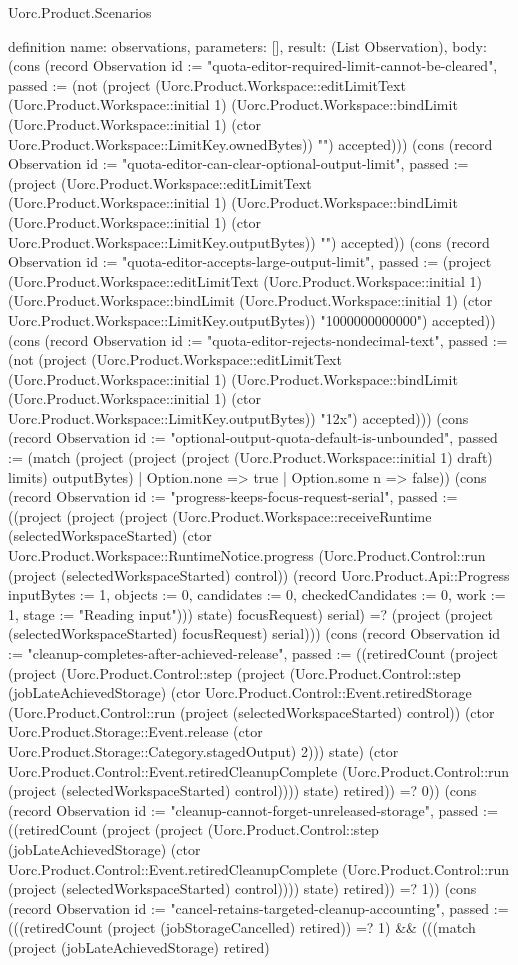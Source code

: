 \begin{lexlean}{Uorc.Product.Scenarios}
\begin{semanticmodule}
definition{
  name: observations,
  parameters: [],
  result: (List Observation),
  body: (cons (record Observation {id := "quota-editor-required-limit-cannot-be-cleared", passed := (not (project (Uorc.Product.Workspace::editLimitText (Uorc.Product.Workspace::initial 1) (Uorc.Product.Workspace::bindLimit (Uorc.Product.Workspace::initial 1) (ctor Uorc.Product.Workspace::LimitKey.ownedBytes)) "") accepted))}) (cons (record Observation {id := "quota-editor-can-clear-optional-output-limit", passed := (project (Uorc.Product.Workspace::editLimitText (Uorc.Product.Workspace::initial 1) (Uorc.Product.Workspace::bindLimit (Uorc.Product.Workspace::initial 1) (ctor Uorc.Product.Workspace::LimitKey.outputBytes)) "") accepted)}) (cons (record Observation {id := "quota-editor-accepts-large-output-limit", passed := (project (Uorc.Product.Workspace::editLimitText (Uorc.Product.Workspace::initial 1) (Uorc.Product.Workspace::bindLimit (Uorc.Product.Workspace::initial 1) (ctor Uorc.Product.Workspace::LimitKey.outputBytes)) "1000000000000") accepted)}) (cons (record Observation {id := "quota-editor-rejects-nondecimal-text", passed := (not (project (Uorc.Product.Workspace::editLimitText (Uorc.Product.Workspace::initial 1) (Uorc.Product.Workspace::bindLimit (Uorc.Product.Workspace::initial 1) (ctor Uorc.Product.Workspace::LimitKey.outputBytes)) "12x") accepted))}) (cons (record Observation {id := "optional-output-quota-default-is-unbounded", passed := (match (project (project (project (Uorc.Product.Workspace::initial 1) draft) limits) outputBytes)
    | Option.none => true
    | Option.some n => false)}) (cons (record Observation {id := "progress-keeps-focus-request-serial", passed := ((project (project (project (Uorc.Product.Workspace::receiveRuntime (selectedWorkspaceStarted) (ctor Uorc.Product.Workspace::RuntimeNotice.progress (Uorc.Product.Control::run (project (selectedWorkspaceStarted) control)) (record Uorc.Product.Api::Progress {inputBytes := 1, objects := 0, candidates := 0, checkedCandidates := 0, work := 1, stage := "Reading input"}))) state) focusRequest) serial) =? (project (project (selectedWorkspaceStarted) focusRequest) serial))}) (cons (record Observation {id := "cleanup-completes-after-achieved-release", passed := ((retiredCount (project (project (Uorc.Product.Control::step (project (Uorc.Product.Control::step (jobLateAchievedStorage) (ctor Uorc.Product.Control::Event.retiredStorage (Uorc.Product.Control::run (project (selectedWorkspaceStarted) control)) (ctor Uorc.Product.Storage::Event.release (ctor Uorc.Product.Storage::Category.stagedOutput) 2))) state) (ctor Uorc.Product.Control::Event.retiredCleanupComplete (Uorc.Product.Control::run (project (selectedWorkspaceStarted) control)))) state) retired)) =? 0)}) (cons (record Observation {id := "cleanup-cannot-forget-unreleased-storage", passed := ((retiredCount (project (project (Uorc.Product.Control::step (jobLateAchievedStorage) (ctor Uorc.Product.Control::Event.retiredCleanupComplete (Uorc.Product.Control::run (project (selectedWorkspaceStarted) control)))) state) retired)) =? 1)}) (cons (record Observation {id := "cancel-retains-targeted-cleanup-accounting", passed := (((retiredCount (project (jobStorageCancelled) retired)) =? 1) && (((match (project (jobLateAchievedStorage) retired)
}}
\end{semanticmodule}
\end{lexlean}

